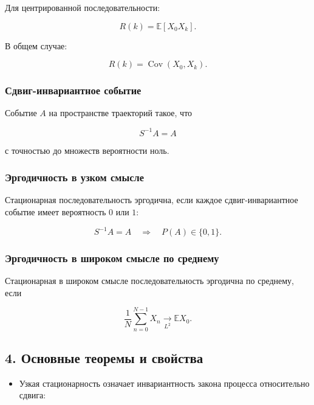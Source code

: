 \documentclass[
  11pt,
  a4paper,
]{article}
\providecommand{\tightlist}{%
  \setlength{\itemsep}{0pt}\setlength{\parskip}{0pt}}
\begin{document}
Для центрированной последовательности:

\[
R(k)=\mathbb E[X_0X_k].
\]

В общем случае:

\[
R(k)=\operatorname{Cov}(X_0,X_k).
\]

\subsubsection{Сдвиг-инвариантное
событие}\label{ux441ux434ux432ux438ux433-ux438ux43dux432ux430ux440ux438ux430ux43dux442ux43dux43eux435-ux441ux43eux431ux44bux442ux438ux435}

Событие \(A\) на пространстве траекторий такое, что

\[
S^{-1}A=A
\]

с точностью до множеств вероятности ноль.

\subsubsection{Эргодичность в узком
смысле}\label{ux44dux440ux433ux43eux434ux438ux447ux43dux43eux441ux442ux44c-ux432-ux443ux437ux43aux43eux43c-ux441ux43cux44bux441ux43bux435}

Стационарная последовательность эргодична, если каждое
сдвиг-инвариантное событие имеет вероятность \(0\) или \(1\):

\[
S^{-1}A=A
\quad\Rightarrow\quad
P(A)\in\{0,1\}.
\]

\subsubsection{Эргодичность в широком смысле по
среднему}\label{ux44dux440ux433ux43eux434ux438ux447ux43dux43eux441ux442ux44c-ux432-ux448ux438ux440ux43eux43aux43eux43c-ux441ux43cux44bux441ux43bux435-ux43fux43e-ux441ux440ux435ux434ux43dux435ux43cux443}

Стационарная в широком смысле последовательность эргодична по среднему,
если

\[
\frac1N\sum_{n=0}^{N-1}X_n
\xrightarrow[L^2]{}
\mathbb E X_0.
\]

\subsection{4. Основные теоремы и
свойства}\label{ux43eux441ux43dux43eux432ux43dux44bux435-ux442ux435ux43eux440ux435ux43cux44b-ux438-ux441ux432ux43eux439ux441ux442ux432ux430}

\begin{itemize}
\tightlist
\item
  Узкая стационарность означает инвариантность закона процесса
  относительно сдвига:
\end{itemize}
\end{document}
